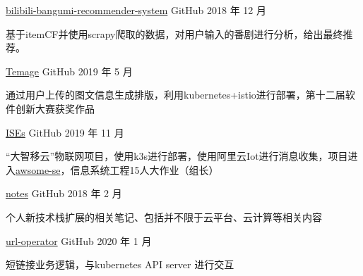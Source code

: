 

\begin{cventries}

  \cventry
    {} %
    {\href{https://github.com/tx19980520/bilibili-demo-back-end}{bilibili-bangumi-recommender-system}} %
    {GitHub} %
    {2018 年 12 月} %
    {
      \begin{cvitems} %
        \item 基于itemCF并使用scrapy爬取的数据，对用户输入的番剧进行分析，给出最终推荐。
      \end{cvitems}
    }

  \cventry
    {} %
    {\href{https://github.com/wangtianxia-sjtu/Temage}{Temage}} %
    {GitHub} %
    {2019 年 5 月} %
    {
      \begin{cvitems} %
        \item 通过用户上传的图文信息生成排版，利用kubernetes+istio进行部署，第十二届软件创新大赛获奖作品
      \end{cvitems}
    }

  \cventry
    {} %
    {\href{https://github.com/tx19980520/ISEs}{ISEs}} %
    {GitHub} %
    {2019 年 11 月} %
    {
      \begin{cvitems} %
        \item “大智移云”物联网项目，使用k3s进行部署，使用阿里云Iot进行消息收集，项目进入\href{https://github.com/SJTU-SE/awesome-se}{awsome-se}，信息系统工程15人大作业（组长）
      \end{cvitems}
    }

  \cventry
    {} %
    {\href{https://github.com/tx19980520/new-tech-stack}{notes}} %
    {GitHub} %
    {2018 年 2 月} %
    {
      \begin{cvitems} %
        \item 个人新技术栈扩展的相关笔记、包括并不限于云平台、云计算等相关内容
      \end{cvitems}
    }

  \cventry
    {} %
    {\href{https://github.com/tx19980520/url-operator}{url-operator}} %
    {GitHub} %
    {2020 年 1 月} %
    {
      \begin{cvitems} %
        \item 短链接业务逻辑，与kubernetes API server 进行交互
      \end{cvitems}
    }


\end{cventries}
